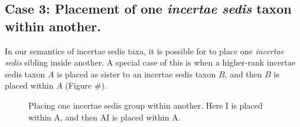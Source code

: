\documentclass[english]{article}
\newcommand{\lyxdot}{.}
\begin{document}
\subsection{Case 3: Placement of one \emph{incertae sedis} taxon within
another.}

In our semantics of incertae sedis taxa, it is possible for to place
one \emph{incertae sedis} sibling inside another. A special case of
this is when a higher-rank incertae sedis taxon $A$ is placed as
sister to an incertae sedis taxon $B$, and then $B$ is placed within
$A$ (Figure \#).

\begin{figure}

\caption{\label{fig:Placing-one-incertae}Placing one incertae sedis group
within another. Here I is placed within A, and then AI is placed within
A.}
\end{figure}
\end{document}
